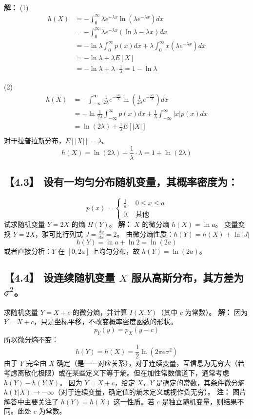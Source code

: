 \documentclass[11pt, a4paper]{article}
\begin{document}
\textbf{解：}
(1) 
\[
\begin{aligned}
h(X) &= - \int_{0}^{\infty} \lambda e^{-\lambda x} \ln(\lambda e^{-\lambda x}) dx \\
&= - \int_{0}^{\infty} \lambda e^{-\lambda x} (\ln \lambda - \lambda x) dx \\
&= - \ln \lambda \int_{0}^{\infty} p(x) dx + \lambda \int_{0}^{\infty} x (\lambda e^{-\lambda x}) dx \\
&= - \ln \lambda + \lambda E[X] \\
&= - \ln \lambda + \lambda \cdot \frac{1}{\lambda} = 1 - \ln \lambda
\end{aligned}
\]

(2) 
\[
\begin{aligned}
h(X) &= - \int_{-\infty}^{\infty} \frac{1}{2\lambda} e^{-\frac{|x|}{\lambda}} \ln \left( \frac{1}{2\lambda} e^{-\frac{|x|}{\lambda}} \right) dx \\
&= - \ln \frac{1}{2\lambda} \int_{-\infty}^{\infty} p(x) dx + \frac{1}{\lambda} \int_{-\infty}^{\infty} |x| p(x) dx \\
&= \ln(2\lambda) + \frac{1}{\lambda} E[|X|] \\
\end{aligned}
\]
对于拉普拉斯分布，$E[|X|] = \lambda$。
\[ h(X) = \ln(2\lambda) + \frac{1}{\lambda} \cdot \lambda = 1 + \ln(2\lambda) \]

\subsection*{【4.3】 设有一均匀分布随机变量，其概率密度为：}
\[ p(x) = \begin{cases} \frac{1}{a}, & 0 \le x \le a \\ 0, & \text{其他} \end{cases} \]
试求随机变量 $Y = 2X$ 的熵 $H(Y)$。
\textbf{解：}
$X$ 的微分熵 $h(X) = \ln a$。
变量变换 $Y = 2X$，雅可比行列式 $J = \frac{dy}{dx} = 2$。
由微分熵性质：$h(Y) = h(X) + \ln |J|$
\[ h(Y) = \ln a + \ln 2 = \ln(2a) \]
或者直接分析：$Y$ 在 $[0, 2a]$ 上均匀分布，故 $h(Y) = \ln(2a)$。

\subsection*{【4.4】 设连续随机变量 $X$ 服从高斯分布，其方差为 $\sigma^2$。}
求随机变量 $Y = X + c$ 的微分熵，并计算 $I(X;Y)$（其中 $c$ 为常数）。
\textbf{解：}
因为 $Y = X + c$，只是坐标平移，不改变概率密度函数的形状。
\[ p_Y(y) = p_X(y-c) \]
所以微分熵不变：
\[ h(Y) = h(X) = \frac{1}{2} \ln(2\pi e \sigma^2) \]
由于 $Y$ 完全由 $X$ 确定（是一一对应关系），对于连续变量，互信息为无穷大（若考虑离散化极限）或在某些定义下等于熵。但在加性常数信道下，通常考虑 $h(Y) - h(Y|X)$。
因为 $Y=X+c$，给定 $X$，$Y$ 是确定的常数，其条件微分熵 $h(Y|X) \to -\infty$（对于连续变量，确定值的熵未定义或视作负无穷）。
\textbf{注：} 图片解答中主要关注了 $h(Y)=h(X)$ 这一性质。若 $c$ 是独立随机变量，则结果不同。此处 $c$ 为常数。
\end{document}
